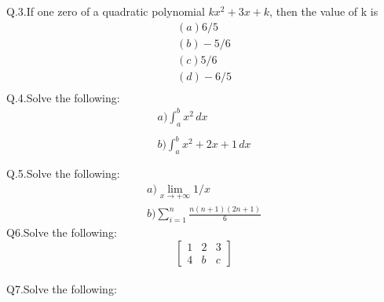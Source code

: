 \documentclass[12 pt]{article}
\begin{document}
	Q.3.If one zero of a quadratic polynomial $kx^2+3x+k$, then the value of k is\\
	\begin{align*}
		(a)   6/5\\
		(b)   -5/6\\
		(c)    5/6\\
		(d)   -6/5\\
	\end{align*}
	Q.4.Solve the following:\\
	\begin{align*}
	a)\int_{a}^{b} x^2 \,dx \\  \\
	b)\int_{a}^{b} x^2+2x+1 \,dx \\  \\
    \end{align*}
	Q.5.Solve the following:\\
	\begin{align*}
	a)\lim_{x \to +\infty} 1/x \\ 
	b)\sum_{i=1}^n \frac{n(n+1)(2n+1)}{6}
    \end{align*}
	\newpage
	Q6.Solve the following:
	\begin{equation*}
		\begin{bmatrix}
			1 & 2 & 3\\
			4 & b & c
		\end{bmatrix}
	\end{equation*}\\
	Q7.Solve the following:\\ \\
\end{document}
